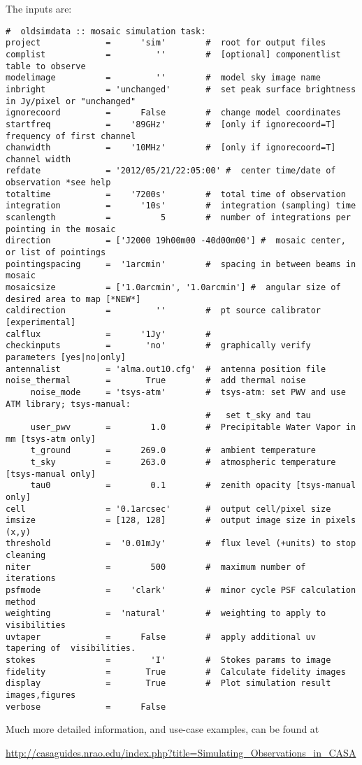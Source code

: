 The inputs are:
\small
\begin{verbatim}
#  oldsimdata :: mosaic simulation task:
project             =      'sim'        #  root for output files
complist            =         ''        #  [optional] componentlist table to observe
modelimage          =         ''        #  model sky image name
inbright            = 'unchanged'       #  set peak surface brightness in Jy/pixel or "unchanged"
ignorecoord         =      False        #  change model coordinates
startfreq           =    '89GHz'        #  [only if ignorecoord=T] frequency of first channel
chanwidth           =    '10MHz'        #  [only if ignorecoord=T] channel width
refdate             = '2012/05/21/22:05:00' #  center time/date of observation *see help
totaltime           =    '7200s'        #  total time of observation
integration         =      '10s'        #  integration (sampling) time
scanlength          =          5        #  number of integrations per pointing in the mosaic
direction           = ['J2000 19h00m00 -40d00m00'] #  mosaic center, or list of pointings
pointingspacing     =  '1arcmin'        #  spacing in between beams in mosaic
mosaicsize          = ['1.0arcmin', '1.0arcmin'] #  angular size of desired area to map [*NEW*]
caldirection        =         ''        #  pt source calibrator [experimental]
calflux             =      '1Jy'        #
checkinputs         =       'no'        #  graphically verify parameters [yes|no|only]
antennalist         = 'alma.out10.cfg'  #  antenna position file
noise_thermal       =       True        #  add thermal noise
     noise_mode     = 'tsys-atm'        #  tsys-atm: set PWV and use ATM library; tsys-manual:
                                        #   set t_sky and tau
     user_pwv       =        1.0        #  Precipitable Water Vapor in mm [tsys-atm only]
     t_ground       =      269.0        #  ambient temperature
     t_sky          =      263.0        #  atmospheric temperature [tsys-manual only]
     tau0           =        0.1        #  zenith opacity [tsys-manual only]
cell                = '0.1arcsec'       #  output cell/pixel size
imsize              = [128, 128]        #  output image size in pixels (x,y)
threshold           =  '0.01mJy'        #  flux level (+units) to stop cleaning
niter               =        500        #  maximum number of iterations
psfmode             =    'clark'        #  minor cycle PSF calculation method
weighting           =  'natural'        #  weighting to apply to visibilities
uvtaper             =      False        #  apply additional uv tapering of  visibilities.
stokes              =        'I'        #  Stokes params to image
fidelity            =       True        #  Calculate fidelity images
display             =       True        #  Plot simulation result images,figures
verbose             =      False        
\end{verbatim}
\normalsize

Much more detailed information, and use-case examples, can be found at 

\url{http://casaguides.nrao.edu/index.php?title=Simulating_Observations_in_CASA}

